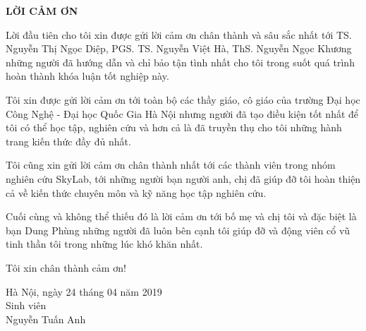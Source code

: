 \documentclass[12pt]{report}
\begin{document}
		\newpage
		\begin{center}
			\textbf{\large LỜI CẢM ƠN}
																																																																																																																 
																																																																																																															
		\end{center}
																																																																										
		Lời đầu tiên cho tôi xin được gửi lời cảm ơn chân thành và sâu sắc nhất tới TS. Nguyễn Thị Ngọc Diệp, PGS. TS. Nguyễn Việt Hà, ThS. Nguyễn Ngọc Khương những người đã hướng dẫn và chỉ bảo tận tình nhất cho tôi trong suốt quá trình hoàn thành khóa luận tốt nghiệp này.
																																																																										
		Tôi xin được gửi lời cảm ơn tới toàn bộ các thầy giáo, cô giáo của trường Đại học Công Nghệ - Đại học Quốc Gia Hà Nội nhưng người đã tạo điều kiện tốt nhất để tôi có thể học tập, nghiên cứu và hơn cả là đã truyền thụ cho tôi những hành trang kiến thức đầy đủ nhất.
																																																																										
		Tôi cũng xin gửi lời cảm ơn chân thành nhất tới các thành viên trong nhóm nghiên cứu SkyLab, tới những người bạn người anh, chị đã giúp đỡ tôi hoàn thiện cả về kiến thức chuyên môn và kỹ năng học tập nghiên cứu.
																																																																										
		Cuối cùng và không thể thiếu đó là lời cảm ơn tới bố mẹ và chị tôi và đặc biệt là bạn Dung Phùng những người đã luôn bên cạnh tôi giúp đỡ và động viên cổ vũ tinh thần tôi trong những lúc khó khăn nhất.
																																																																										
		Tôi xin chân thành cảm ơn!
																																																																										
		\begin{flushright}
			\begin{varwidth}{\linewidth}\centering
				Hà Nội, ngày 24 tháng 04 năm 2019\\
				Sinh viên\\[2cm]
				Nguyễn Tuấn Anh
			\end{varwidth}
		\end{flushright}
																																																																											
\end{document}
